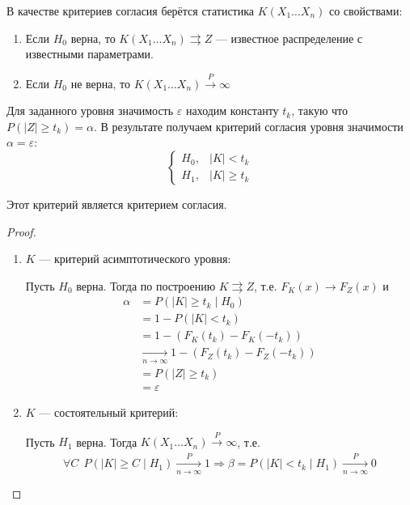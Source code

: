 В качестве критериев согласия берётся статистика \(K(X_1 \dots X_n)\) со свойствами:
\begin{enumerate}
    \item Если \(H_0\) верна, то \(K(X_1 \dots X_n) \rightrightarrows Z\) --- известное распределение с известными параметрами.
    \item Если \(H_0\) не верна, то \(K(X_1 \dots X_n) \xrightarrow{P} \infty\)
\end{enumerate}
Для заданного уровня значимость \(\varepsilon\) находим константу \(t_k\), такую что \(P(|Z| \geq t_k) = \alpha\). В результате получаем критерий согласия уровня значимости \(\alpha = \varepsilon\):
\[\begin{cases}
        H_0, & |K| < t_k    \\
        H_1, & |K| \geq t_k
    \end{cases}\]
\begin{theorem}
    Этот критерий является критерием согласия.
\end{theorem}
\begin{proof}\itemfix
    \begin{enumerate}
        \item \(K\) --- критерий асимптотического уровня:

              Пусть \(H_0\) верна. Тогда по построению \(K \rightrightarrows Z\), т.е. \(F_K(x) \to F_Z(x)\) и
              \begin{align*}
                  \alpha & = P(|K| \geq t_k \mid H_0)                                \\
                         & = 1 - P(|K| < t_k)                                        \\
                         & = 1 - (F_K(t_k) - F_K( -t_k))                             \\
                         & \xrightarrow[n \to \infty ]{} 1 - (F_Z(t_k) - F_Z( -t_k)) \\
                         & = P(|Z| \geq t_k)                                         \\
                         & = \varepsilon
              \end{align*}
        \item \(K\) --- состоятельный критерий:

              Пусть \(H_1\) верна. Тогда \(K(X_1 \dots X_n) \xrightarrow[]{P} \infty\), т.е.
              \[\forall C \ \ P(|K| \geq C \mid H_1) \xrightarrow[n \to \infty ]{P} 1 \Rightarrow \beta = P(|K| < t_k \mid H_1) \xrightarrow[n \to \infty ]{P} 0\]
    \end{enumerate}
\end{proof}

